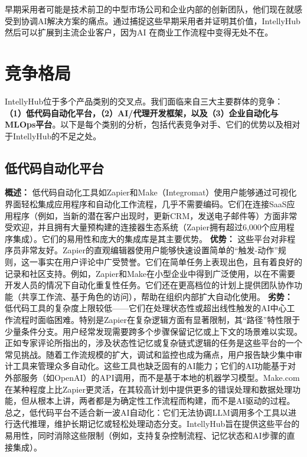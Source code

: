 \documentclass[11pt, a4paper, oneside]{article}
\begin{document}
早期采用者可能是技术前卫的中型市场公司和企业内部的创新团队，他们现在就感受到协调AI解决方案的痛点。通过捕捉这些早期采用者并证明其价值，IntellyHub然后可以扩展到主流企业客户，因为AI 在商业工作流程中变得无处不在。

\section{竞争格局}
IntellyHub位于多个产品类别的交叉点。我们面临来自三大主要群体的竞争： \textbf{（1）低代码自动化平台，（2）AI/代理开发框架，以及（3）企业自动化与MLOps平台}。以下是每个类别的分析，包括代表竞争对手、它们的优势以及相对于IntellyHub的不足之处。

\subsection{低代码自动化平台}

\textbf{概述：} 低代码自动化工具如Zapier和Make（Integromat）使用户能够通过可视化界面轻松集成应用程序和自动化工作流程，几乎不需要编码。它们在连接SaaS应用程序（例如，当新的潜在客户出现时，更新CRM，发送电子邮件等）方面非常受欢迎，并且拥有大量预构建的连接器生态系统（Zapier拥有超过6,000个应用程序集成\cite{zapierApps}）。它们的易用性和庞大的集成库是其主要优势。 \newline\newline
\textbf{优势：} 这些平台对非程序员非常友好。Zapier的直观编辑器使用户能够快速设置简单的“触发-动作”规则，这一事实在用户评论中广受赞誉\cite{g2ZapierReviews}。它们在简单任务上表现出色，且有着良好的记录和社区支持。例如，Zapier和Make在小型企业中得到广泛使用，以在不需要开发人员的情况下自动化重复性任务。它们还在更高档位的计划上提供团队协作功能（共享工作流、基于角色的访问），帮助在组织内部扩大自动化使用\cite{zapierPricing}。\newline\newline
\textbf{劣势：} 低代码工具的复杂度上限较低——它们在处理状态性或超出线性触发的AI中心工作流程时面临困难。特别是Zapier在复杂逻辑方面有显著限制，其“路径”特性限于少量条件分支。用户经常发现需要跨多个步骤保留记忆或上下文的场景难以实现。正如专家评论所指出的，涉及状态性记忆或复杂链式逻辑的任务是这些平台的一个常见挑战。随着工作流规模的扩大，调试和监控也成为痛点，用户报告缺少集中审计工具来管理众多自动化\cite{g2ZapierReviews}。这些工具也缺乏固有的AI能力；它们的AI功能基于对外部服务（如OpenAI）的API调用，而不是基于本地的机器学习模型\cite{zapierOpenAI}。Make.com在某种程度上比Zapier更灵活，在其较高计划中提供更多的错误处理和数据处理功能\cite{g2MakeVsZapier}，但从根本上讲，两者都是为确定性工作流程而构建，而不是AI驱动的过程。总之，低代码平台不适合新一波AI自动化：它们无法协调LLM调用多个工具以进行迭代推理，维护长期记忆或轻松处理动态分支。IntellyHub旨在提供这些平台的易用性，同时消除这些限制（例如，支持复杂控制流程、记忆状态和AI步骤的直接集成）。
\end{document}
